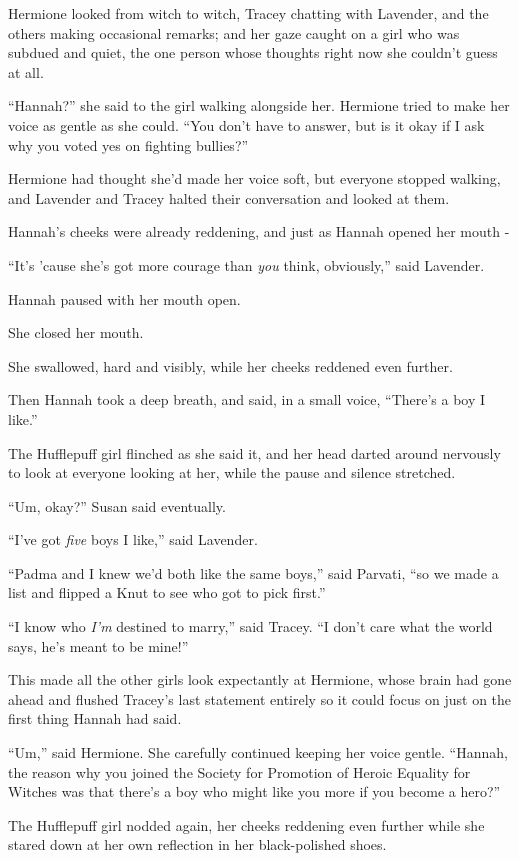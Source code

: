 Hermione looked from witch to witch, Tracey chatting with Lavender, and
the others making occasional remarks; and her gaze caught on a girl who
was subdued and quiet, the one person whose thoughts right now she
couldn't guess at all.

``Hannah?'' she said to the girl walking alongside her. Hermione tried
to make her voice as gentle as she could. ``You don't have to answer,
but is it okay if I ask why you voted yes on fighting bullies?''

Hermione had thought she'd made her voice soft, but everyone stopped
walking, and Lavender and Tracey halted their conversation and looked at
them.

Hannah's cheeks were already reddening, and just as Hannah opened her
mouth -

``It's 'cause she's got more courage than \emph{you} think, obviously,''
said Lavender.

Hannah paused with her mouth open.

She closed her mouth.

She swallowed, hard and visibly, while her cheeks reddened even further.

Then Hannah took a deep breath, and said, in a small voice, ``There's a
boy I like.''

The Hufflepuff girl flinched as she said it, and her head darted around
nervously to look at everyone looking at her, while the pause and
silence stretched.

``Um, okay?'' Susan said eventually.

``I've got \emph{five} boys I like,'' said Lavender.

``Padma and I knew we'd both like the same boys,'' said Parvati, ``so we
made a list and flipped a Knut to see who got to pick first.''

``I know who \emph{I'm} destined to marry,'' said Tracey. ``I don't care
what the world says, he's meant to be mine!''

This made all the other girls look expectantly at Hermione, whose brain
had gone ahead and flushed Tracey's last statement entirely so it could
focus on just on the first thing Hannah had said.

``Um,'' said Hermione. She carefully continued keeping her voice gentle.
``Hannah, the reason why you joined the Society for Promotion of Heroic
Equality for Witches was that there's a boy who might like you more if
you become a hero?''

The Hufflepuff girl nodded again, her cheeks reddening even further
while she stared down at her own reflection in her black-polished shoes.


